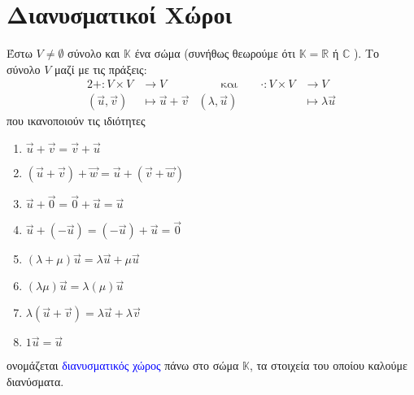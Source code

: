 







\chapter{Διανυσματικοί Χώροι}

\begin{dfn}
	Έστω $V \neq \emptyset$ σύνολο και $\mathbb{K}$ ένα σώμα (συνήθως θεωρούμε ότι $ \mathbb{K} =
	\mathbb{R} $ ή $\mathbb{C}$ ). Το σύνολο $V$ μαζί με τις πράξεις:
	\begin{alignat*}{2}
		+ \colon V \times V &\to V & \qquad \text{και} \qquad \cdot \colon V \times V &\to V \\
		( \vec{u}, \vec{v} ) &\mapsto \vec{u} + \vec{v} & ( \lambda, \vec{u} ) &\mapsto \lambda \vec{u} 
	\end{alignat*}
που ικανοποιούν τις ιδιότητες 

\begin{enumerate}
	\item $ \vec{u} + \vec{v} = \vec{v} + \vec{u} $ 
	\item $ ( \vec{u} + \vec{v} ) + \vec{w} = \vec{u} + ( \vec{v} + \vec{w}) $ 
	\item $ \vec{u} + \vec{0} = \vec{0} + \vec{u} = \vec{u} $ 
	\item $ \vec{u} + ( - \vec{u} ) = ( - \vec{u} ) + \vec{u} = \vec{0} $ 
	\item $ ( \lambda + \mu ) \vec{u} = \lambda \vec{u} + \mu \vec{u} $ 
	\item $ ( \lambda \mu ) \vec{u} = \lambda ( \mu) \vec{u} $ 
	\item $ \lambda ( \vec{u} + \vec{v} ) = \lambda \vec{u} + \lambda \vec{v} $ 
	\item $ 1 \vec{u} = \vec{u} $ 
\end{enumerate}
ονομάζεται \textcolor{blue}{διανυσματικός χώρος} πάνω στο σώμα $\mathbb{K}$, τα στοιχεία του οποίου
καλούμε διανύσματα.

\end{dfn}



